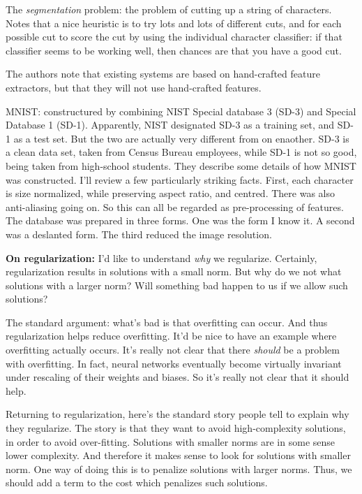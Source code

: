 \documentclass[12pt]{article}
\begin{document}
The \emph{segmentation} problem: the problem of cutting up a string of
characters.  Notes that a nice heuristic is to try lots and lots of
different cuts, and for each possible cut to score the cut by using
the individual character classifier: if that classifier seems to be
working well, then chances are that you have a good cut.

The authors note that existing systems are based on hand-crafted
feature extractors, but that they will not use hand-crafted features.

MNIST: constructured by combining NIST Special database 3 (SD-3) and
Special Database 1 (SD-1).  Apparently, NIST designated SD-3 as a
training set, and SD-1 as a test set.  But the two are actually very
different from on enaother.  SD-3 is a clean data set, taken from
Census Bureau employees, while SD-1 is not so good, being taken from
high-school students.  They describe some details of how MNIST was
constructed.  I'll review a few particularly striking facts.  First,
each character is size normalized, while preserving aspect ratio, and
centred.  There was also anti-aliasing going on.  So this can all be
regarded as pre-processing of features.  The database was prepared in
three forms.  One was the form I know it.  A second was a deslanted
form.  The third reduced the image resolution.

\textbf{On regularization:} I'd like to understand \emph{why} we
regularize.  Certainly, regularization results in solutions with a
small norm.  But why do we not what solutions with a larger norm?
Will something bad happen to us if we allow such solutions?

The standard argument: what's bad is that overfitting can occur.  And
thus regularization helps reduce overfitting.  It'd be nice to have an
example where overfitting actually occurs.  It's really not clear that
there \emph{should} be a problem with overfitting.  In fact, neural
networks eventually become virtually invariant under rescaling of
their weights and biases.  So it's really not clear that it should
help.

Returning to regularization, here's the standard story people tell to
explain why they regularize.  The story is that they want to avoid
high-complexity solutions, in order to avoid over-fitting.  Solutions
with smaller norms are in some sense lower complexity.  And therefore
it makes sense to look for solutions with smaller norm.  One way of
doing this is to penalize solutions with larger norms.  Thus, we
should add a term to the cost which penalizes such solutions.
\end{document}
